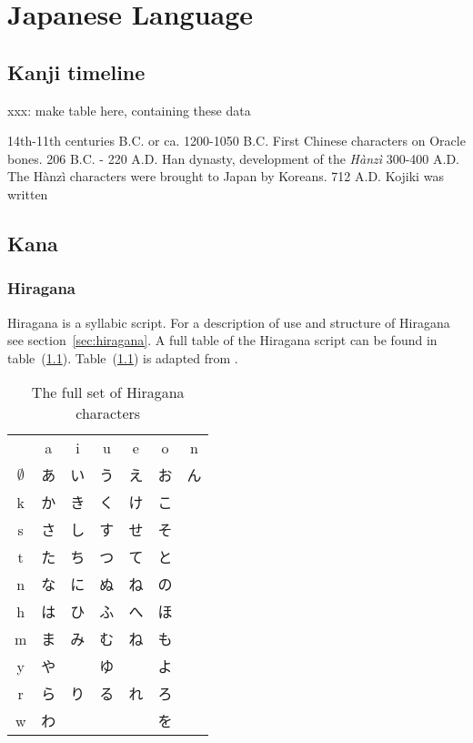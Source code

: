 
\chapter{Japanese Language}
\label{chap:app:japaneselanguage}

\section{Kanji timeline}
\label{sec:app:kanjitimeline}

xxx: make table here, containing these data

14th-11th centuries B.C. or ca. 1200-1050 B.C. First Chinese characters on Oracle bones. 
206 B.C. - 220 A.D. Han dynasty, development of the \emph{Hànzì}
300-400 A.D. The Hànzì characters were brought to Japan by Koreans.
712 A.D. Kojiki was written


\section{Kana }
\label{sec:app:kana}

\subsection{Hiragana }
\label{sec:app:hiragana}

Hiragana is a syllabic script. For a description of use and structure of
Hiragana see section~\ref{sec:hiragana}. A full table of the Hiragana script can 
be found in table~(\ref{table:fullhiragana}).
Table~(\ref{table:fullhiragana}) is adapted from .

\begin{table}[htbp]
\begin{CJK}
  \begin{tabular}{c c c c c c c}
 &a&i&u&e&o&n\\
$\emptyset$&あ&い&う&え&お&ん\\
k&か&き&く&け&こ&\\
s&さ&し&す&せ&そ&\\
t&た&ち&つ&て&と&\\
n&な&に&ぬ&ね&の&\\
h&は&ひ&ふ&へ&ほ&\\
m&ま&み&む&ね&も&\\
y&や& &ゆ& &よ&\\
r&ら&り&る&れ&ろ&\\
w&わ& & & &を&\\
  \end{tabular}
\end{CJK}
\caption{The full set of Hiragana characters}
\label{table:fullhiragana}
\end{table}

